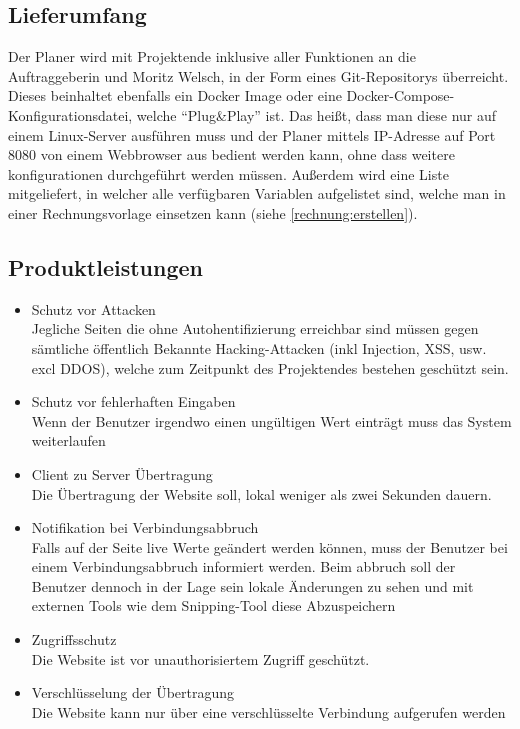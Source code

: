     \subsection{Lieferumfang}
        Der Planer wird mit Projektende inklusive aller Funktionen an die Auftraggeberin und Moritz Welsch, in der Form eines Git-Repositorys überreicht. Dieses beinhaltet ebenfalls  ein Docker Image oder eine Docker-Compose-Konfigurationsdatei, welche ``Plug\&Play'' ist. Das heißt, dass man diese nur auf einem Linux-Server ausführen muss und der Planer mittels IP-Adresse auf Port 8080 von einem Webbrowser aus bedient werden kann, ohne dass weitere konfigurationen durchgeführt werden müssen. Außerdem wird eine Liste mitgeliefert, in welcher alle verfügbaren Variablen aufgelistet sind, welche man in einer Rechnungsvorlage einsetzen kann (siehe \ref{rechnung:erstellen}).
    \subsection{Produktleistungen}
    \begin{itemize}[leftmargin=1.0in]
        \item [\ll] Schutz vor Attacken \\
            Jegliche Seiten die ohne Autohentifizierung erreichbar sind müssen gegen sämtliche öffentlich Bekannte Hacking-Attacken (inkl Injection, XSS, usw. excl DDOS), welche zum Zeitpunkt des Projektendes bestehen geschützt sein.
        \item [\ll] Schutz vor fehlerhaften Eingaben \\
            Wenn der Benutzer irgendwo einen ungültigen Wert einträgt muss das System weiterlaufen
        \item [\ll] Client zu Server Übertragung \\
            Die Übertragung der Website soll, lokal weniger als zwei Sekunden dauern.
        \item [\ll] Notifikation bei Verbindungsabbruch \\
            Falls auf der Seite live Werte geändert werden können, muss der Benutzer bei einem Verbindungsabbruch informiert werden. Beim abbruch soll der Benutzer dennoch in der Lage sein lokale Änderungen zu sehen und mit externen Tools wie dem Snipping-Tool diese Abzuspeichern
        \item [\ll] Zugriffsschutz \\
            Die Website ist vor unauthorisiertem Zugriff geschützt.
        \item [\ll] Verschlüsselung der Übertragung \\
            Die Website kann nur über eine verschlüsselte Verbindung aufgerufen werden
    \end{itemize}
